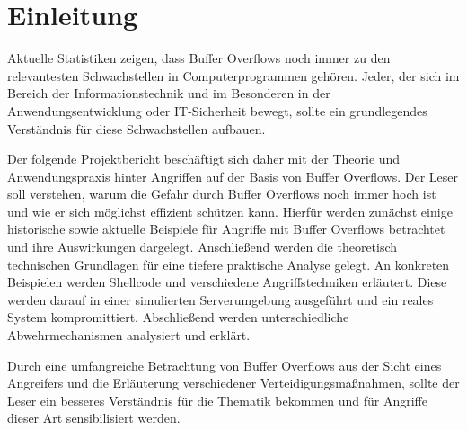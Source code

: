 \section{Einleitung}
Aktuelle Statistiken zeigen, dass Buffer Overflows noch immer zu den relevantesten Schwachstellen in Computerprogrammen gehören.
Jeder, der sich im Bereich der Informationstechnik und im Besonderen in der Anwendungsentwicklung oder IT-Sicherheit bewegt,
sollte ein grundlegendes Verständnis für diese Schwachstellen aufbauen.

Der folgende Projektbericht beschäftigt sich daher mit der Theorie und Anwendungspraxis hinter Angriffen auf der Basis von Buffer Overflows.
Der Leser soll verstehen, warum die Gefahr durch Buffer Overflows noch immer hoch ist und wie er sich möglichst effizient schützen kann.
Hierfür werden zunächst einige historische sowie aktuelle Beispiele für Angriffe mit Buffer Overflows betrachtet und ihre Auswirkungen dargelegt.
Anschließend werden die theoretisch technischen Grundlagen für eine tiefere praktische Analyse gelegt. 
An konkreten Beispielen werden Shellcode und verschiedene Angriffstechniken erläutert. 
Diese werden darauf in einer simulierten Serverumgebung ausgeführt und ein reales System kompromittiert. 
Abschließend werden unterschiedliche Abwehrmechanismen analysiert und erklärt.

Durch eine umfangreiche Betrachtung von Buffer Overflows aus der Sicht eines Angreifers und die Erläuterung verschiedener Verteidigungsmaßnahmen, 
sollte der Leser ein besseres Verständnis für die Thematik bekommen und für Angriffe dieser Art sensibilisiert werden. \cite{owasptop}
